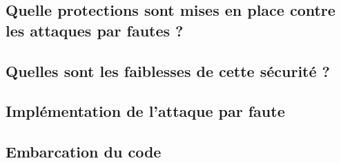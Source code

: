 \subsection{Quelle protections sont mises en place contre les attaques par
fautes ?}


\subsection{Quelles sont les faiblesses de cette sécurité ?}

\subsection{Implémentation de l'attaque par faute}

\subsection{Embarcation du code}
